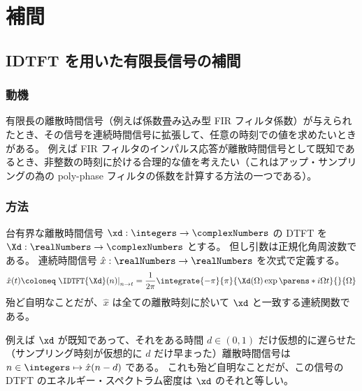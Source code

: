 \chapter{補間}
    \section{IDTFT を用いた有限長信号の補間}
        \subsection{動機}
            有限長の離散時間信号（例えば係数畳み込み型 FIR フィルタ係数）が与えられたとき、その信号を連続時間信号に拡張して、任意の時刻での値を求めたいときがある。
            例えば FIR フィルタのインパルス応答が離散時間信号として既知であるとき、非整数の時刻に於ける合理的な値を考えたい（これはアップ・サンプリングの為の poly-phase フィルタの係数を計算する方法の一つである）。
        \subsection{方法}
            \label{IDTFT を用いた有限長信号の補間の方法}
            台有界な離散時間信号 $\xd:\integers\to\complexNumbers$ の DTFT を $\Xd:\realNumbers\to\complexNumbers$ とする。
            但し引数は正規化角周波数である。
            連続時間信号 $\hat{x}:\realNumbers\to\realNumbers$ を次式で定義する。
            \[ \hat{x}(t)\coloneq\left.\IDTFT{\Xd}(n)\right|_{n\to t} = \frac{1}{2\pi}\integrate{-\pi}{\pi}{\Xd(\Omega)\exp\parens*{i\Omega t}}{}{\Omega} \]
            殆ど自明なことだが、$\hat{x}$ は全ての離散時刻に於いて $\xd$ と一致する連続関数である。
            \par
            例えば $\xd$ が既知であって、それをある時間 $d\in(0,1)$ だけ仮想的に遅らせた（サンプリング時刻が仮想的に $d$ だけ早まった）離散時間信号は $n\in\integers\mapsto\hat{x}(n-d)$ である。
            これも殆ど自明なことだが、この信号の DTFT のエネルギー・スペクトラム密度は $\xd$ のそれと等しい。
